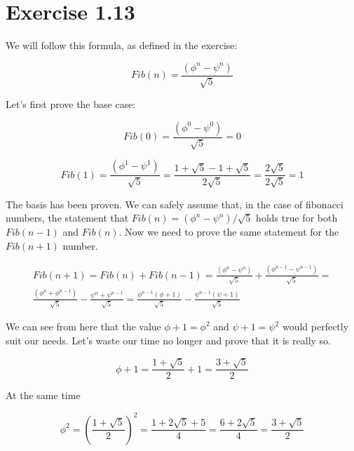 \section*{Exercise 1.13}


	We will follow this formula, as defined in the exercise:

	\begin{equation}
		\label{fibonacci_approximation}
		Fib(n) = {\frac {\left(\phi^n-\psi^n \right)} {\sqrt5}}
	\end {equation}

	Let's first prove the base case:

	\begin{equation}
		Fib(0) = {\frac {\left(\phi^0-\psi^0 \right)} {\sqrt5}} = 0
	\end{equation}

	\begin{equation}
		Fib(1) = {\frac {\left(\phi^1-\psi^1 \right)} {\sqrt5}} = \frac {1 + \sqrt5 - 1 + \sqrt5} {2\sqrt5} = \frac {2\sqrt5} {2\sqrt5} = 1
	\end{equation}

The basis has been proven. We can safely assume that, in the case of fibonacci numbers, the statement that $Fib(n) = \left(\phi^n-\psi^n\right)/\sqrt5$ holds true for both $Fib(n-1)$ and $Fib(n)$. Now we need to prove the same statement for the $Fib(n+1)$ number.

\begin{multline}
	Fib(n+1) = Fib(n) + Fib(n-1) = \frac {\left(\phi^n-\psi^n\right)} {\sqrt5} + \frac {\left(\phi^{n-1}-\psi^{n-1}\right)} {\sqrt5} = \\
	\frac {\left(\phi^n+\phi^{n-1}\right)} {\sqrt5} - \frac {\psi^n+\psi^{n-1}} {\sqrt5} = \frac {\phi^{n-1}\left(\phi+1\right)} {\sqrt5} - \frac {\psi^{n-1}\left(\psi+1\right)} {\sqrt5}
\end{multline}

We can see from here that the value $\phi+1=\phi^2$ and $\psi+1=\psi^2$ would perfectly suit our needs. Let's waste our time no longer and prove that it is really so.

\begin{equation}
	\phi+1 = \frac {1 + \sqrt5} {2} + 1 = \frac {3 + \sqrt5} {2}
\end{equation}

At the same time

\begin{equation}
	\phi^2 = \left(\frac {1 + \sqrt5} {2}\right)^2 = \frac {1 + 2\sqrt5 + 5} {4} = \frac {6 + 2\sqrt5} {4} = \frac {3 + \sqrt5} {2}
\end{equation}

